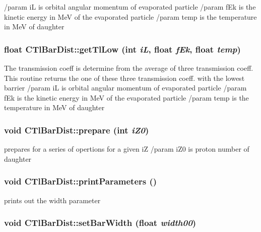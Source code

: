 /param i\-L is orbital angular momentum of evaporated particle /param f\-Ek is the kinetic energy in Me\-V of the evaporated particle /param temp is the temperature in Me\-V of daughter 
\subsubsection{\setlength{\rightskip}{0pt plus 5cm}float CTl\-Bar\-Dist::get\-Tl\-Low (int {\em i\-L}, float {\em f\-Ek}, float {\em temp})}\label{classCTlBarDist_738e5e7608dca02198a8af5bb3e7fed5}


The transmission coeff is determine from the average of three transmission coeff. This routine returns the one of these three transmission coeff. with the lowest barrier /param i\-L is orbital angular momentum of evaporated particle /param f\-Ek is the kinetic energy in Me\-V of the evaporated particle /param temp is the temperature in Me\-V of daughter 
\subsubsection{\setlength{\rightskip}{0pt plus 5cm}void CTl\-Bar\-Dist::prepare (int {\em i\-Z0})}\label{classCTlBarDist_c79746380ee2016f3b170de827e28a9f}


prepares for a series of opertions for a given i\-Z /param i\-Z0 is proton number of daughter 
\subsubsection{\setlength{\rightskip}{0pt plus 5cm}void CTl\-Bar\-Dist::print\-Parameters ()\hspace{0.3cm}{\tt  [static]}}\label{classCTlBarDist_92287b3be6a24629d8c8cd04b9c86590}


prints out the width parameter 
\subsubsection{\setlength{\rightskip}{0pt plus 5cm}void CTl\-Bar\-Dist::set\-Bar\-Width (float {\em width00})\hspace{0.3cm}{\tt  [static]}}\label{classCTlBarDist_482b5e98097343b7d7f37c68091343f0}


